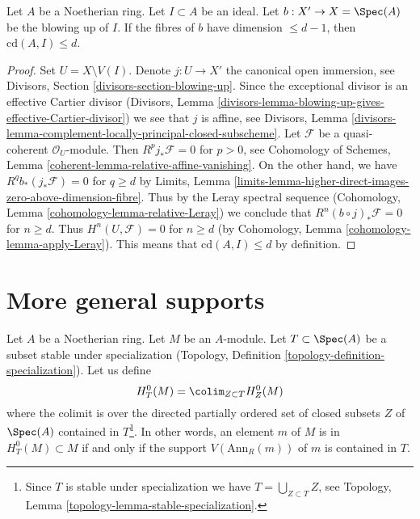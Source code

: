 \begin{lemma}
\label{lemma-cd-blowup}
Let $A$ be a Noetherian ring. Let $I \subset A$ be an ideal.
Let $b : X' \to X = \Spec(A)$ be the blowing up of $I$.
If the fibres of $b$ have dimension $\leq d - 1$, then
$\text{cd}(A, I) \leq d$.
\end{lemma}

\begin{proof}
Set $U = X \setminus V(I)$. Denote $j : U \to X'$ the canonical open
immersion, see Divisors, Section \ref{divisors-section-blowing-up}.
Since the exceptional divisor is an effective Cartier divisor
(Divisors, Lemma
\ref{divisors-lemma-blowing-up-gives-effective-Cartier-divisor})
we see that $j$ is affine, see
Divisors, Lemma
\ref{divisors-lemma-complement-locally-principal-closed-subscheme}.
Let $\mathcal{F}$ be a quasi-coherent $\mathcal{O}_U$-module.
Then $R^pj_*\mathcal{F} = 0$ for $p > 0$, see
Cohomology of Schemes, Lemma
\ref{coherent-lemma-relative-affine-vanishing}.
On the other hand, we have $R^qb_*(j_*\mathcal{F}) = 0$ for
$q \geq d$ by Limits, Lemma
\ref{limits-lemma-higher-direct-images-zero-above-dimension-fibre}.
Thus by the Leray spectral sequence
(Cohomology, Lemma \ref{cohomology-lemma-relative-Leray})
we conclude that $R^n(b \circ j)_*\mathcal{F} = 0$ for
$n \geq d$. Thus $H^n(U, \mathcal{F}) = 0$ for $n \geq d$
(by Cohomology, Lemma \ref{cohomology-lemma-apply-Leray}).
This means that $\text{cd}(A, I) \leq d$ by definition.
\end{proof}







\section{More general supports}
\label{section-supports}

\noindent
Let $A$ be a Noetherian ring. Let $M$ be an $A$-module.
Let $T \subset \Spec(A)$ be a subset stable under specialization
(Topology, Definition \ref{topology-definition-specialization}).
Let us define
$$
H^0_T(M) = \colim_{Z \subset T} H^0_Z(M)
$$
where the colimit is over the directed partially ordered set of
closed subsets $Z$ of $\Spec(A)$ contained in
$T$\footnote{Since $T$ is stable under specialization
we have $T = \bigcup_{Z \subset T} Z$, see
Topology, Lemma \ref{topology-lemma-stable-specialization}.}.
In other words, an element $m$ of $M$ is in $H^0_T(M) \subset M$
if and only if the support $V(\text{Ann}_R(m))$ of $m$
is contained in $T$.

